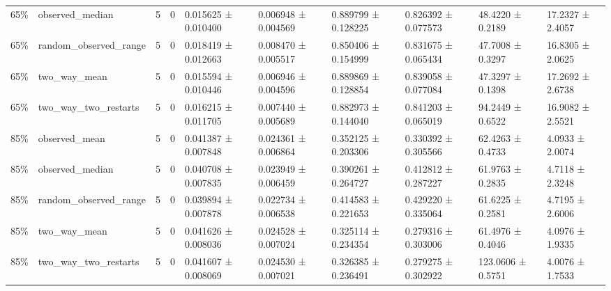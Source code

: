 \begin{table}[t]
\begin{tabular}{llllllllll}
65\% & observed\_median & 5 & 0 & 0.015625 ± 0.010400 & 0.006948 ± 0.004569 & 0.889799 ± 0.128225 & 0.826392 ± 0.077573 & 48.4220 ± 0.2189 & 17.2327 ± 2.4057 \\
65\% & random\_observed\_range & 5 & 0 & 0.018419 ± 0.012663 & 0.008470 ± 0.005517 & 0.850406 ± 0.154999 & 0.831675 ± 0.065434 & 47.7008 ± 0.3297 & 16.8305 ± 2.0625 \\
65\% & two\_way\_mean & 5 & 0 & 0.015594 ± 0.010446 & 0.006946 ± 0.004596 & 0.889869 ± 0.128854 & 0.839058 ± 0.077084 & 47.3297 ± 0.1398 & 17.2692 ± 2.6738 \\
65\% & two\_way\_two\_restarts & 5 & 0 & 0.016215 ± 0.011705 & 0.007440 ± 0.005689 & 0.882973 ± 0.144040 & 0.841203 ± 0.065019 & 94.2449 ± 0.6522 & 16.9082 ± 2.5521 \\
85\% & observed\_mean & 5 & 0 & 0.041387 ± 0.007848 & 0.024361 ± 0.006864 & 0.352125 ± 0.203306 & 0.330392 ± 0.305566 & 62.4263 ± 0.4733 & 4.0933 ± 2.0074 \\
85\% & observed\_median & 5 & 0 & 0.040708 ± 0.007835 & 0.023949 ± 0.006459 & 0.390261 ± 0.264727 & 0.412812 ± 0.287227 & 61.9763 ± 0.2835 & 4.7118 ± 2.3248 \\
85\% & random\_observed\_range & 5 & 0 & 0.039894 ± 0.007878 & 0.022734 ± 0.006538 & 0.414583 ± 0.221653 & 0.429220 ± 0.335064 & 61.6225 ± 0.2581 & 4.7195 ± 2.6006 \\
85\% & two\_way\_mean & 5 & 0 & 0.041626 ± 0.008036 & 0.024528 ± 0.007024 & 0.325114 ± 0.234354 & 0.279316 ± 0.303006 & 61.4976 ± 0.4046 & 4.0976 ± 1.9335 \\
85\% & two\_way\_two\_restarts & 5 & 0 & 0.041607 ± 0.008069 & 0.024530 ± 0.007021 & 0.326385 ± 0.236491 & 0.279275 ± 0.302922 & 123.0606 ± 0.5751 & 4.0076 ± 1.7533 \\
\bottomrule
\end{tabular}
\end{table}
